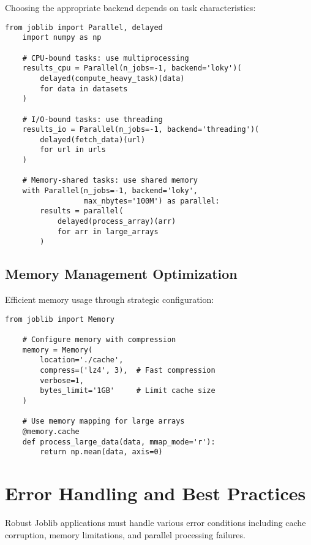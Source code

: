 Choosing the appropriate backend depends on task characteristics:

\begin{lstlisting}[language=MyPython, caption={Backend Selection Guidelines}, label={lst:backend_selection}]
	from joblib import Parallel, delayed
	import numpy as np
	
	# CPU-bound tasks: use multiprocessing
	results_cpu = Parallel(n_jobs=-1, backend='loky')(
	    delayed(compute_heavy_task)(data) 
	    for data in datasets
	)
	
	# I/O-bound tasks: use threading
	results_io = Parallel(n_jobs=-1, backend='threading')(
	    delayed(fetch_data)(url) 
	    for url in urls
	)
	
	# Memory-shared tasks: use shared memory
	with Parallel(n_jobs=-1, backend='loky', 
	              max_nbytes='100M') as parallel:
	    results = parallel(
	        delayed(process_array)(arr) 
	        for arr in large_arrays
	    )
\end{lstlisting}

\subsection{Memory Management Optimization}
\label{subsec:memory_optimization}

Efficient memory usage through strategic configuration:

\begin{lstlisting}[language=MyPython, caption={Memory Optimization Strategies}, label={lst:memory_optimization}]
	from joblib import Memory
	
	# Configure memory with compression
	memory = Memory(
	    location='./cache',
	    compress=('lz4', 3),  # Fast compression
	    verbose=1,
	    bytes_limit='1GB'     # Limit cache size
	)
	
	# Use memory mapping for large arrays
	@memory.cache
	def process_large_data(data, mmap_mode='r'):
	    return np.mean(data, axis=0)
\end{lstlisting}

\section{Error Handling and Best Practices}
\label{sec:best_practices}

Robust Joblib applications must handle various error conditions including cache corruption, memory limitations, and parallel processing failures.

